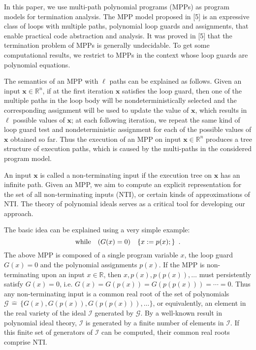 \documentclass{article}
\newcommand{\while}{{\rm while}}
\newcommand{\I}{\mathcal{I}}
\newcommand{\define}{\widehat{=}}
\newcommand{\xx}{\mathbf{x}}
\begin{document}
In this paper, we use multi-path polynomial programs (MPPs) as program models for termination analysis. The MPP model proposed in [5] is an expressive class of loops with multiple paths, polynomial loop guards and assignments, that enable practical code abstraction and analysis. It was proved in [5] that the termination problem of MPPs is generally undecidable. To get some computational results, we restrict to MPPs in the context whose loop guards are polynomial equations.

The semantics of an MPP with $\ell$ paths can be explained as follows. Given an input $\xx \in \mathbb{R}^n$, if at the first iteration $\xx$ satisfies the loop guard, then one of the multiple paths in the loop body will be nondeterministically selected and the corresponding assignment will be used to update the value of $\xx$, which results in $\ell$ possible values of $\xx$; at each following iteration, we repeat the same kind of loop guard test and nondeterministic assignment for each of the possible values of $\xx$ obtained so far. Thus the execution of an MPP on input $\xx \in \mathbb{R}^n$ produces a tree structure of execution paths, which is caused by the multi-paths in the considered program model.

An input $\xx$ is called a non-terminating input if the execution tree on $\xx$ has an infinite path. Given an MPP, we aim to compute an explicit representation for the set of all non-terminating inputs (NTI), or certain kinds of approximations of NTI. The theory of polynomial ideals serves as a critical tool for developing our approach.

The basic idea can be explained using a very simple example:
\[
\while \quad (G(x)=0) \quad \{x:=p(x);\} \enspace .
\]
The above MPP is composed of a single program variable $x$, the loop guard $G(x)=0$ and the polynomial assignments $p(x)$. If the MPP is non-terminating upon an input $x \in \mathbb{R}$, then $x,p(x),p(p(x)),\ldots$ must persistently satisfy $G(x)=0$, i.e. $G(x)=G(p(x))=G(p(p(x)))=\cdots=0$. Thus any non-terminating input is a common real root of the set of polynomials $\mathcal{G}\,\define\,\{G(x),G(p(x)),G(p(p(x))),\ldots\}$, or equivalently, an element in the real variety of the ideal $\I$ generated by $\mathcal{G}$. By a well-known result in polynomial ideal theory, $\I$ is generated by a finite number of elements in $\I$. If this finite set of generators of $\I$ can be computed, their common real roots comprise NTI.
\end{document}
